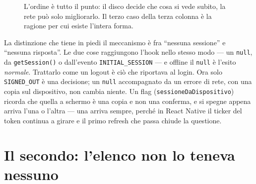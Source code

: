 \documentclass[11pt,a4paper]{report}
\begin{document}
\begin{figure}[H]
\centering
{}
\caption{L'ordine \`e tutto il punto: il disco decide che cosa si vede subito,
la rete pu\`o solo migliorarlo. Il terzo caso della terza colonna \`e la ragione
per cui esiste l'intera forma.}
\end{figure}

La distinzione che tiene in piedi il meccanismo \`e fra ``nessuna sessione'' e
``nessuna risposta''. Le due cose raggiungono l'hook nello stesso modo --- un
\texttt{null}, da \texttt{getSession()} o dall'evento \texttt{INITIAL\_SESSION}
--- e offline il \texttt{null} \`e l'esito \emph{normale}. Trattarlo come un
logout \`e ci\`o che riportava al login. Ora solo \texttt{SIGNED\_OUT} \`e una
decisione; un \texttt{null} accompagnato da un errore di rete, con una copia sul
dispositivo, non cambia niente. Un flag (\texttt{sessioneDaDispositivo}) ricorda
che quella a schermo \`e una copia e non una conferma, e si spegne appena arriva
l'una o l'altra --- una arriva sempre, perch\'e in React Native il ticker del
token continua a girare e il primo refresh che passa chiude la questione.

\section{Il secondo: l'elenco non lo teneva nessuno}
\end{document}
